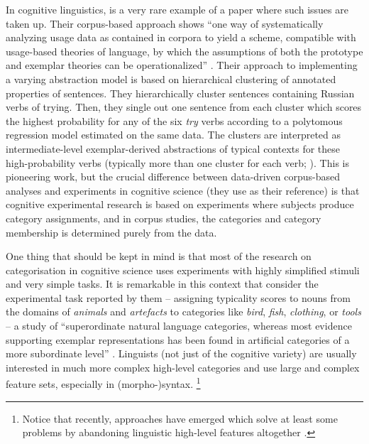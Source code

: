 In cognitive linguistics, \cite{DivjakArppe2013} is a very rare example of a paper where such issues are taken up.
Their corpus-based approach shows ``one way of systematically analyzing usage data as contained in corpora to yield a scheme, compatible with usage-based theories of language, by which the assumptions of both the prototype and exemplar theories can be operationalized'' \citep[267]{DivjakArppe2013}.
Their approach to implementing a varying abstraction model \citep[254--260]{DivjakArppe2013} is based on hierarchical clustering of annotated properties of sentences.
They hierarchically cluster sentences containing Russian verbs of trying.
Then, they single out one sentence from each cluster which scores the highest probability for any of the six \textit{try} verbs according to a polytomous regression model estimated on the same data.
The clusters are interpreted as intermediate-level exemplar-derived abstractions of typical contexts for these high-probability verbs (typically more than one cluster for each verb; \citealp[255--256]{DivjakArppe2013}).
This is pioneering work, but the crucial difference between data-driven corpus-based analyses and experiments in cognitive science (they use \citealp{VerbeemenEa2007} as their reference) is that cognitive experimental research is based on experiments where subjects produce category assignments, and in corpus studies, the categories and category membership is determined purely from the data.

One thing that should be kept in mind is that most of the research on categorisation in cognitive science uses experiments with highly simplified stimuli and very simple tasks.
It is remarkable in this context that \cite{VoorspoelsEa2011} consider the experimental task reported by them -- assigning typicality scores to nouns from the domains of \textit{animals} and \textit{artefacts} to categories like \textit{bird}, \textit{fish}, \textit{clothing}, or \textit{tools} -- a study of ``superordinate natural language categories, whereas most evidence supporting exemplar representations has been found in artificial categories of a more subordinate level'' \citep[1013]{VoorspoelsEa2011}.
Linguists (not just of the cognitive variety) are usually interested in much more complex high-level categories and use large and complex feature sets, especially in (morpho-)syntax.%
\footnote{Notice that recently, approaches have emerged which solve at least some problems by abandoning linguistic high-level features altogether \citep{BaayenEa2016,RamscarPort2016}.}

